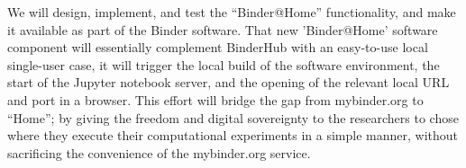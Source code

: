 \begin{task}
We will design, implement, and test the ``Binder@Home'' functionality, and make it
available as part of the Binder software. That new 'Binder@Home' software component will
essentially complement BinderHub with an easy-to-use local single-user case, it will trigger
the local build of the software environment, the start of the Jupyter notebook
server, and the opening of the relevant local URL and port in a browser.
This effort will bridge the gap from mybinder.org to ``Home'';
by giving the freedom and digital sovereignty
to the researchers to chose where they execute their computational experiments in a simple manner,
without sacrificing the convenience of the mybinder.org service.

\end{task}
